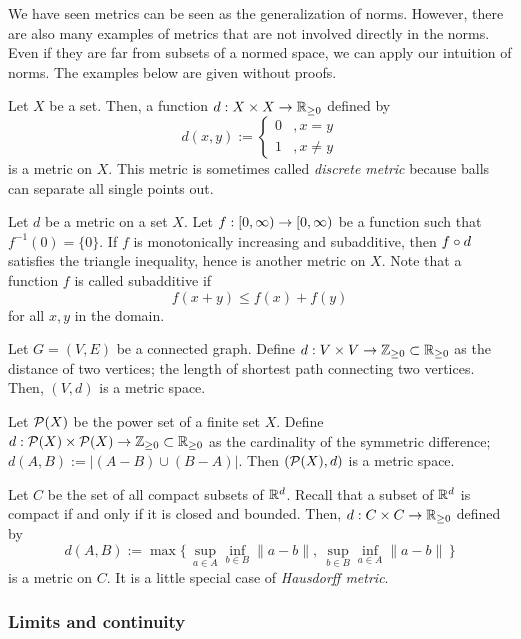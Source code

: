 We have seen metrics can be seen as the generalization of norms.
However, there are also many examples of metrics that are not involved directly in the norms.
Even if they are far from subsets of a normed space, we can apply our intuition of norms.
The examples below are given without proofs.

\begin{ex}\label{ex:discrete metric is a metric}
Let $X$ be a set.
Then, a function $d:X\x X\to\R_{\ge0}$ defined by
\[d(x,y):=\begin{cases}0&,x=y\\1&,x\ne y\end{cases}\]
is a metric on $X$.
This metric is sometimes called \emph{discrete metric} because balls can separate all single points out.
\end{ex}
\begin{ex}\label{ex:composition with mis function is still metric}
Let $d$ be a metric on a set $X$.
Let $f:[0,\oo)\to[0,\oo)$ be a function such that $f^{-1}(0)=\{0\}$.
If $f$ is monotonically increasing and subadditive, then $f\o d$ satisfies the triangle inequality, hence is another metric on $X$.
Note that a function $f$ is called subadditive if
\[f(x+y)\le f(x)+f(y)\]
for all $x,y$ in the domain.
\end{ex}
\begin{ex}
Let $G=(V,E)$ be a connected graph.
Define $d:V\x V\to\Z_{\ge0}\subset\R_{\ge0}$ as the distance of two vertices; the length of shortest path connecting two vertices.
Then, $(V,d)$ is a metric space.
\end{ex}
\begin{ex}
Let $\mathcal{P}(X)$ be the power set of a finite set $X$.
Define $d:\cP(X)\x\cP(X)\to\Z_{\ge0}\subset\R_{\ge0}$ as the cardinality of the symmetric difference; $d(A,B):=|(A-B)\cup(B-A)|$.
Then $(\mathcal{P}(X),d)$ is a metric space.
\end{ex}
\begin{ex}
Let $C$ be the set of all compact subsets of $\mathbb{R}^d$.
Recall that a subset of $\mathbb{R}^d$ is compact if and only if it is closed and bounded.
Then, $d:C\x C\to\R_{\ge0}$ defined by
\[d(A,B):=\max\{\,\sup_{a\in A}\inf_{b\in B}\|a-b\|,\ \sup_{b\in B}\inf_{a\in A}\|a-b\|\,\}\]
is a metric on $C$.
It is a little special case of \emph{Hausdorff metric}.
\end{ex}



\subsubsection{Limits and continuity}

